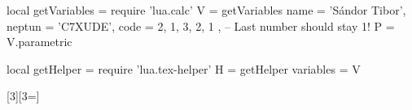 \usepackage{luacode}

\begin{luacode}
  local getVariables = require 'lua.calc'
  V = getVariables {
      name = 'Sándor Tibor',
      neptun = 'C7XUDE',
      code = { 2, 1, 3, 2, 1 }, -- Last number should stay 1!
    }
  P = V.parametric

  local getHelper = require 'lua.tex-helper'
  H = getHelper {
      variables = V
    }
\end{luacode}

\usepackage{xargs}
\newcommand{\lv}[1]{\directlua{H.printVar [[#1]]}}
\newcommand{\lvec}[2]{\directlua{H.printVec { name="#1", index=#2 }}}
[3][3=]{}
\newcommand{\dv}[1]{\directlua{H.printDirect(#1)}}
